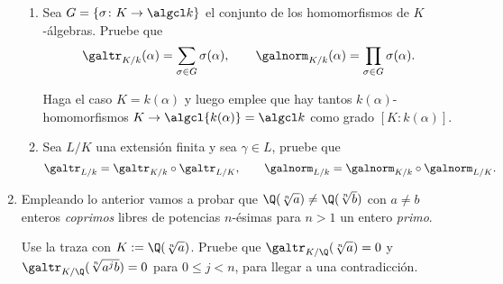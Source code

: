 \documentclass[11pt, reqno]{amsart}
\begin{document}
\begin{enumerate}
\begin{enumerate}
			\item\lookst
				Sea $G = \{ \sigma \colon K \to \algcl k \}$ el conjunto de los homomorfismos de
				$K$-álgebras. Pruebe que
				\[
					\galtr_{K/k}(\alpha) = \sum_{\sigma \in G} \sigma(\alpha),
					\qquad
					\galnorm_{K/k}(\alpha) = \prod_{\sigma \in G} \sigma(\alpha).
				\]

				\begin{hint}
					Haga el caso $K = k(\alpha)$ y luego emplee que hay tantos
					$k(\alpha)$-homomorfismos $K \to \algcl{k(\alpha)} = \algcl k$ como grado $[K :
					k(\alpha)]$.
				\end{hint}

			\item Sea $L/K$ una extensión finita y sea $\gamma \in L$, pruebe que
				\[
					\galtr_{L/k} = \galtr_{K/k} \circ \galtr_{L/K},
					\qquad
					\galnorm_{L/k} = \galnorm_{K/k} \circ \galnorm_{L/K}.
				\]
		\end{enumerate}

	\item Empleando lo anterior vamos a probar que $\Q(\sqrt[n]{a}) \ne \Q(\sqrt[n]{b})$ con $a \ne b$ enteros
		\emph{coprimos} libres de potencias $n$-ésimas para $n > 1$ un entero \emph{primo}.

		\begin{hint}
			Use la traza con $K := \Q(\sqrt[n]{a})$.
			Pruebe que $\galtr_{K/\Q}(\sqrt[n]{a}) = 0$ y $\galtr_{K/\Q}(\sqrt[n]{a^j b}) = 0$ para $0 \le j
			< n$, para llegar a una contradicción.
		\end{hint}
\end{enumerate}

\appendix
\end{document}
